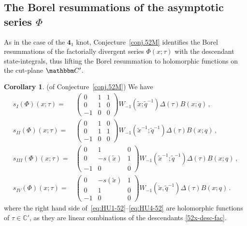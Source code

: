 \documentclass[12pt,reqno]{amsart}
\theoremstyle{definition}
\newtheorem{corollary}[theorem]{Corollary}
\def\BC{\mathbbm C}
\def\tq{\tilde{q}}
\def\tx{\tilde{x}}
\def\-{\,-\,}
\def\tx{\tilde{x}}
\def\md{\mathbf}
\def\IC{\mathbb{C}}
\newcommand{\knot}[1]{\md{#1}}
\begin{document}
\subsection{The Borel resummations of the asymptotic series $\Phi$}
\label{sub.borel52}

As in the case of the $\knot{4}_1$ knot, Conjecture~\ref{conj.52M}
identifies the Borel resummations of the factorially divergent series
$\Phi(x;\tau)$ with the descendant state-integrals, thus lifting the
Borel resummation to holomorphic functions on the cut-plane $\BC'$.

\begin{corollary}(of Conjecture~\ref{conj.52M})
  \label{cor.52borel}
  We have 
  \begin{subequations}
    \begin{align}
      s_{I}(\Phi)(x;\tau) =
      &\begin{pmatrix}
        0&1&1\\0&1&0\\-1&0&0
      \end{pmatrix} W_{-1}(\tx;\tq^{-1})\Delta(\tau)B(x;q)\,,
                        \label{eq:HU1-52}\\
  s_{II}(\Phi)(x;\tau) =
  &\begin{pmatrix}
    0&1&0\\0&1&1\\-1&0&0
  \end{pmatrix} W_{-1}(\tx^{-1};\tq^{-1})
                                    \Delta(\tau) B(x;q)\,,
                         \label{eq:HU2-52}\\
  s_{III}(\Phi)(x;\tau) =
  &\begin{pmatrix}
    0&1&0\\0&-s(\tx)&1\\-1&0&0
  \end{pmatrix} W_{-1}(\tx^{-1};\tq^{-1})
                                    \Delta(\tau) B(x;q)\,,
                         \label{eq:HU3-52}\\
  s_{IV}(\Phi)(x;\tau)=
  &\begin{pmatrix}
    0&-s(\tx)&1\\0&1&0\\-1&0&0
  \end{pmatrix}W_{-1}(\tx,\tq^{-1})\Delta(\tau) B(x;q)\,.
                  \label{eq:HU4-52}
\end{align}
\end{subequations}
where the right hand side of~\eqref{eq:HU1-52}--\eqref{eq:HU4-52} are
holomorphic functions of $\tau \in \IC'$, as they are linear
combinations of the descendants \eqref{52x-desc-fac}.
\end{corollary}
\end{document}
